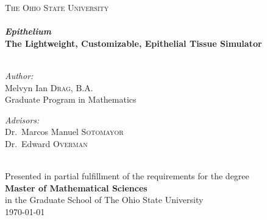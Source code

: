 \begin{titlepage}
\begin{center}

\textsc{\LARGE The Ohio State University}\\[1.5cm]

\HRule \\[0.4cm]
{ \huge \bfseries \emph{Epithelium} \\[0.2cm] \small The Lightweight, Customizable, Epithelial Tissue Simulator \\[0.4cm] }
\HRuleBig \\[1.5cm]

\noindent
\begin{minipage}{0.4\textwidth}
\begin{flushleft} \large
\emph{Author:}\\
Melvyn Ian \textsc{Drag}, B.A.\\
Graduate Program in Mathematics\\ 
\end{flushleft}
\end{minipage}%
\begin{minipage}{0.4\textwidth}
\begin{flushright} \large
\emph{Advisors:} \\
Dr.~Marcos Manuel \textsc{Sotomayor}\\
Dr.~Edward \textsc{Overman}
\end{flushright}
\end{minipage}
\\[4cm]
\vspace{4cm}
Presented in partial fulfillment of the requirements for the degree\\
{\bf{Master of Mathematical Sciences}}\\ in the Graduate School of The Ohio State University \\[1cm]
{\large \today}

\end{center}
\end{titlepage}

